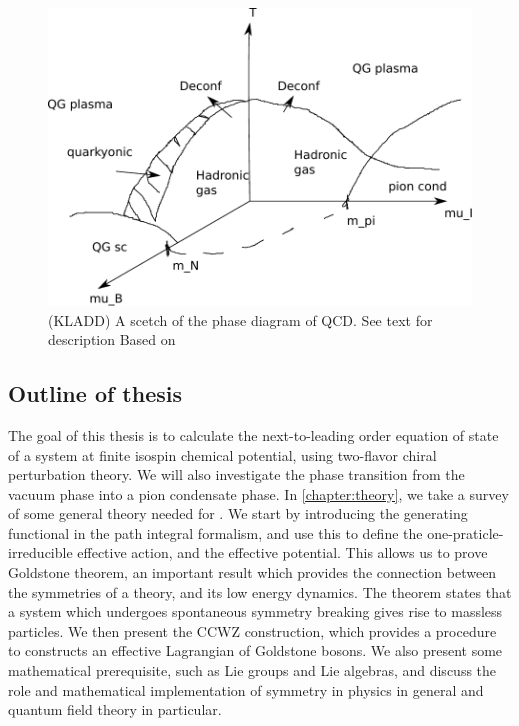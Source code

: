 \begin{figure}
    \centering
    \includegraphics[]{figurer/phase_diagram.pdf}
    \caption{(KLADD) A scetch of the phase diagram of QCD. See text for description Based on~\cite{from_hadrons_to_quarks,
    Brandt:QCD_phase_diagram_with_isospin_chemical_potential,Brandt:QCD_phase_diagram_for_nonzero_isospin-asymmetry,Fukushima:The_phase_diagram_of_dense_QCD,mannarelli:meson_condensation}
    }
    \label{fig:phase diag qcd}
\end{figure}

\subsection*{Outline of thesis}
The goal of this thesis is to calculate the next-to-leading order equation of state of a system at finite isospin chemical potential, using two-flavor chiral perturbation theory.
We will also investigate the phase transition from the vacuum phase into a pion condensate phase.
In \autoref{chapter:theory}, we take a survey of some general theory needed for \chpt.
We start by introducing the generating functional in the path integral formalism, and use this to define the one-praticle-irreducible effective action, and the effective potential.
This allows us to prove Goldstone theorem, an important result which provides the connection between the symmetries of a theory, and its low energy dynamics.
The theorem states that a system which undergoes spontaneous symmetry breaking gives rise to massless particles.
We then present the CCWZ construction, which provides a procedure to constructs an effective Lagrangian of Goldstone bosons.
We also present some mathematical prerequisite, such as Lie groups and Lie algebras, and discuss the role and mathematical implementation of symmetry in physics in general and quantum field theory in particular.

